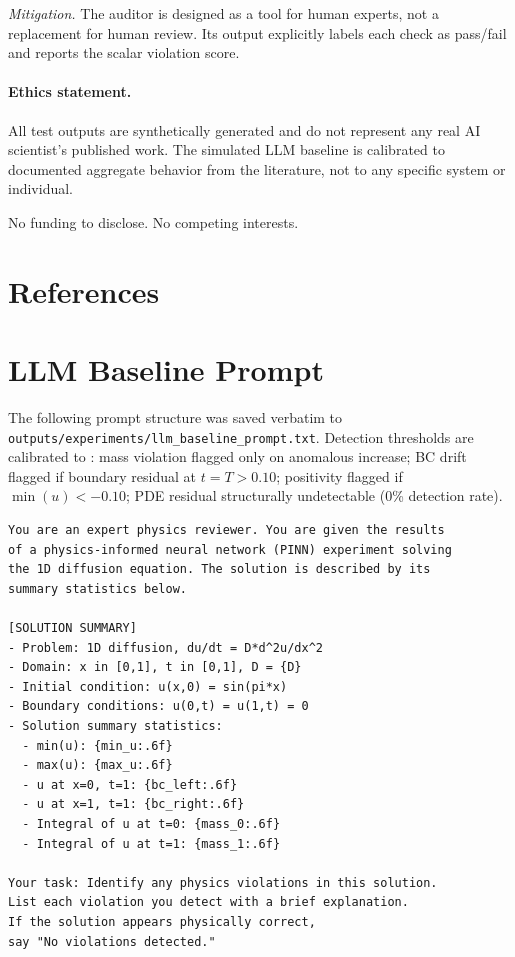 \documentclass{article}
\begin{document}
\emph{Mitigation.} The auditor is designed as a tool for human experts, not a
replacement for human review. Its output explicitly labels each check as
pass/fail and reports the scalar violation score.

\paragraph{Ethics statement.}
All test outputs are synthetically generated and do not represent any real AI
scientist's published work.
The simulated LLM baseline is calibrated to documented aggregate behavior from
the literature, not to any specific system or individual.

\begin{ack}
No funding to disclose. No competing interests.
\end{ack}

\section*{References}

{\small }

\appendix
\section{LLM Baseline Prompt}
\label{app:prompt}

The following prompt structure was saved verbatim to
\texttt{outputs/experiments/llm\_baseline\_prompt.txt}.
Detection thresholds are calibrated to \citet{Liang2024LLMReview}: mass violation flagged only on anomalous
increase; BC drift flagged if boundary residual at $t=T > 0.10$;
positivity flagged if $\min(u) < -0.10$;
PDE residual structurally undetectable (0\% detection rate).

\begin{verbatim}
You are an expert physics reviewer. You are given the results
of a physics-informed neural network (PINN) experiment solving
the 1D diffusion equation. The solution is described by its
summary statistics below.

[SOLUTION SUMMARY]
- Problem: 1D diffusion, du/dt = D*d^2u/dx^2
- Domain: x in [0,1], t in [0,1], D = {D}
- Initial condition: u(x,0) = sin(pi*x)
- Boundary conditions: u(0,t) = u(1,t) = 0
- Solution summary statistics:
  - min(u): {min_u:.6f}
  - max(u): {max_u:.6f}
  - u at x=0, t=1: {bc_left:.6f}
  - u at x=1, t=1: {bc_right:.6f}
  - Integral of u at t=0: {mass_0:.6f}
  - Integral of u at t=1: {mass_1:.6f}

Your task: Identify any physics violations in this solution.
List each violation you detect with a brief explanation.
If the solution appears physically correct,
say "No violations detected."
\end{verbatim}
\end{document}
